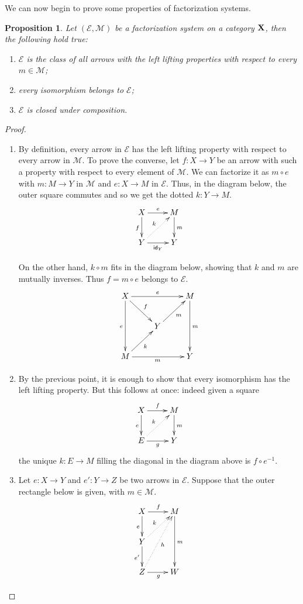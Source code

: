 \documentclass[a4paper]{article}
\newcommand{\id}[1]{\mathsf{id}_{#1}}
\def\X{\textbf {\textup{X}}}
\def\Y{\textbf {\textup{Y}}}
\def\E{\textbf {\textup{E}}}
\newtheorem{proposition}[theorem]{Proposition}
\theoremstyle{definition}
\begin{document}
We can now begin to prove some properties of factorization systems.

\begin{proposition}\label{prop:el}
	Let $(\mathcal{E}, \mathcal{M})$ be a factorization system on a category $\X$, then the following hold true:
	\begin{enumerate}
		\item $\mathcal{E}$ is the class of all arrows with the left lifting properties with respect to every $m\in \mathcal{M}$;
		\item every isomorphism belongs to $\mathcal{E}$;
		\item $\mathcal{E}$ is closed under composition.
	\end{enumerate}
\end{proposition}
\begin{proof}
	\begin{enumerate}
		\item By definition, every arrow in $\mathcal{E}$ has the left lifting property with respect to every arrow in $\mathcal{M}$. To prove the converse, let $f\colon X\to Y$ be an arrow with such a property with respect to every element of $\mathcal{M}$.  We can factorize it as $m\circ e$ with $m\colon M\to Y$ in $\mathcal{M}$ and $e\colon X\to M$ in $\mathcal{E}$. Thus, in the diagram below, the outer square commutes and so we get the dotted $k\colon Y\to M$.
		\[\xymatrix{X\ar[d]_f\ar[r]^e & M\ar[d]^{m}\\Y\ar[r]_{\id{Y}} \ar@{.>}[ur]^{k} & Y}\]
		
		On the other hand, $k\circ m$ fits in the diagram below, showing that $k$ and $m$ are mutually inverses. Thus $f=m\circ e$ belongs to $\mathcal{E}$.
		\[\xymatrix{X\ar[rr]^{e} \ar[dd]_{e} \ar[dr]^{f}&& M\ar[dd]^{m} \ar@{<-}[dl]^{m}\\& Y\ar@{<-}[dl]^{k}\\M \ar[rr]_{m}&&Y}\]
		\item By the previous point, it is enough to show that every isomorphism has the left lifting property. But this follows at once: indeed given a square
		\[\xymatrix{X\ar[d]_e\ar[r]^f & M\ar[d]^{m}\\E\ar[r]_{g} \ar@{.>}[ur]^{k} & Y}\]
		the unique $k\colon E\to M$ filling the diagonal in the diagram above is $f\circ e^{-1}$.
		
		\item Let $e\colon X\to Y$ and $e'\colon Y\to Z$ be two arrows in $\mathcal{E}$. Suppose that the outer rectangle below is given, with $m\in \mathcal{M}$.
		\[\xymatrix{X  \ar[r]^f \ar[d]_{e}& M \ar[dd]^{m}\\Y \ar@{.>}[ur]^{k} \ar[d]_{e'}\\Z \ar@{.>}[uur]_{h}\ar[r]_{g}& W}\]
		

\end{enumerate}
\end{proof}
\end{document}
